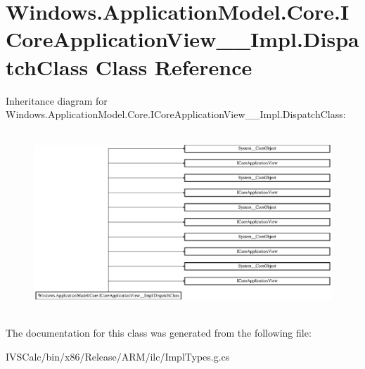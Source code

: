 \hypertarget{class_windows_1_1_application_model_1_1_core_1_1_i_core_application_view_____impl_1_1_dispatch_class}{}\section{Windows.\+Application\+Model.\+Core.\+I\+Core\+Application\+View\+\_\+\+\_\+\+Impl.\+Dispatch\+Class Class Reference}
\label{class_windows_1_1_application_model_1_1_core_1_1_i_core_application_view_____impl_1_1_dispatch_class}
Inheritance diagram for Windows.\+Application\+Model.\+Core.\+I\+Core\+Application\+View\+\_\+\+\_\+\+Impl.\+Dispatch\+Class\+:\begin{figure}[H]
\begin{center}
\leavevmode
\includegraphics[height=6.844445cm]{class_windows_1_1_application_model_1_1_core_1_1_i_core_application_view_____impl_1_1_dispatch_class}
\end{center}
\end{figure}


The documentation for this class was generated from the following file\+:\begin{DoxyCompactItemize}
\item 
I\+V\+S\+Calc/bin/x86/\+Release/\+A\+R\+M/ilc/Impl\+Types.\+g.\+cs\end{DoxyCompactItemize}
